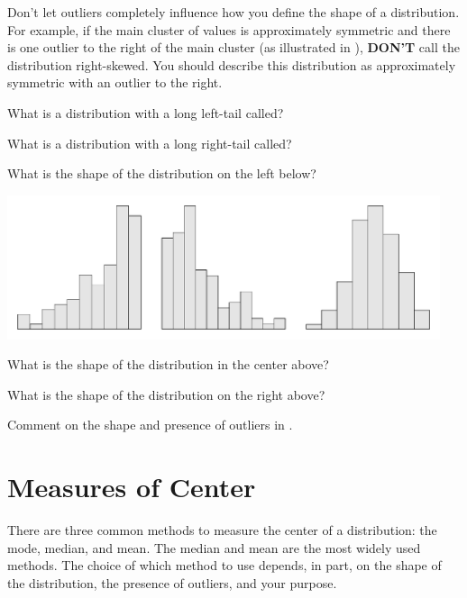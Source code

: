 \documentclass[10pt,openany]{book}\usepackage[]{graphicx}\usepackage[]{color}
\begin{document}
Don't let outliers completely influence how you define the shape of a distribution.  For example, if the main cluster of values is approximately symmetric and there is one outlier to the right of the main cluster (as illustrated in ), \textbf{DON'T} call the distribution right-skewed.  You should describe this distribution as approximately symmetric with an outlier to the right.


\vspace{-12pt}

\vspace{24pt}
\begin{exsection}
  \item \label{revex:quEDALSkew} What is a distribution with a long left-tail called? 
  \item \label{revex:quEDARSkew} What is a distribution with a long right-tail called? 
  \item \label{revex:quEDALSkewg} What is the shape of the distribution on the left below? 


\begin{center}
  \includegraphics[width=5in]{Figs/HistQuest-1}
\end{center}
  \item \label{revex:quEDASymg} What is the shape of the distribution in the center above? 
  \item \label{revex:quEDARSkewg} What is the shape of the distribution on the right above? 
  \item \label{revex:quEDAlead} Comment on the shape and presence of outliers in . 
\end{exsection}


\section{Measures of Center} \label{sec:quEDACenter}
There are three common methods to measure the center of a distribution: the mode, median, and mean.  The median and mean are the most widely used methods.  The choice of which method to use depends, in part, on the shape of the distribution, the presence of outliers, and your purpose.
\end{document}
